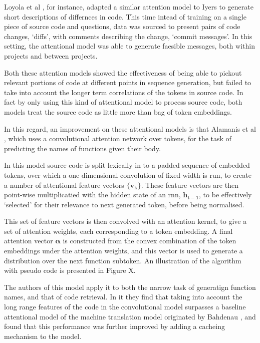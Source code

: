 Loyola et al \cite{loyola_neural_2017}, for instance, adapted a similar attention model to Iyers to generate short descriptions of differnces in code.
This time intead of training on a single piece of source code and questions, data was sourced to present pairs of code changes, `diffs', with comments describing the change, `commit messages'. 
In this setting, the attentional model was able to generate faesible messages, both within projects and between projects.

Both these attention models showed the effectiveness of being able to pickout relevant portions of code at different points in sequence generation, but failed to take into account the longer term correlations of the tokens in source code. In fact by only using this kind of attentional model to process source code, both models treat the source code as little more than bag of token embeddings.

In this regard, an improvement on these attentional models is that Alamanis et al \cite{allamanis_convolutional_2016}, which uses a convolutional attention network over tokens, for the task of predicting the names of functions given their body. 

In this model source code is split lexically in to a padded sequence of embedded tokens, over which a one dimensional convolution of fixed width is run, to create a number of attentional feature vectors $\mathbf{\{v_k\}}$.
These feature vectors are then point-wise multiplicatied with the hidden state of an rnn, $\mathbf{h_{t-1}}$, to be effectively `selected' for their relevance to next generated token, before being normalised.

This set of feature vectors is then convolved with an attention kernel, to give a set of attention weights, each corresponding to a token embedding. 
A final attention vector $\mathbf{\alpha}$ is constructed from the convex combination of the token embeddings under the attention weights, and this vector is used to generate a distribution over the next function subtoken.
An illustration of the algorithm with pseudo code is presented in Figure X.

The authors of this model apply it to both the narrow task of generatign function names, and that of code retrieval. In it they find that taking into account the long range features of the code in the convolutional model surpasses a baseline attentional model of the machine translation model originated by Bahdenau \cite{bahdanau_neural_2014}, and found that this performance was further improved by adding a cacheing mechanism to the model.

